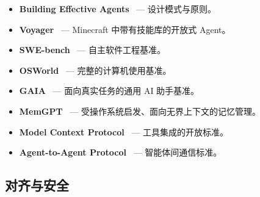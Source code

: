 \begin{itemize}
  \item \textbf{Building Effective Agents}~\cite{anthropic2024buildingagents} --- 设计模式与原则。
  \item \textbf{Voyager}~\cite{wang2023voyager} --- Minecraft 中带有技能库的开放式 Agent。
  \item \textbf{SWE-bench}~\cite{jimenez2024swebench} --- 自主软件工程基准。
  \item \textbf{OSWorld}~\cite{xie2024osworld} --- 完整的计算机使用基准。
  \item \textbf{GAIA}~\cite{mialon2023gaia} --- 面向真实任务的通用 AI 助手基准。
  \item \textbf{MemGPT}~\cite{packer2023memgpt} --- 受操作系统启发、面向无界上下文的记忆管理。
  \item \textbf{Model Context Protocol}~\cite{anthropic-mcp-2024} --- 工具集成的开放标准。
  \item \textbf{Agent-to-Agent Protocol}~\cite{google-a2a-2025} --- 智能体间通信标准。
\end{itemize}

\subsection{对齐与安全}
\label{alignment-and-safety}

